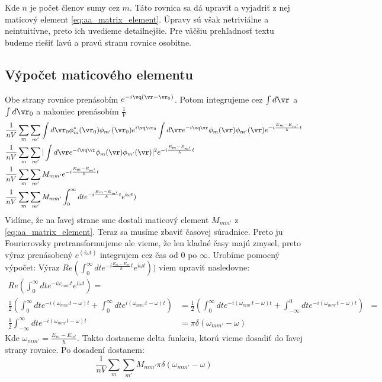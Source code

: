 Kde $n$ je počet členov sumy cez $m$. Táto rovnica sa dá upraviť a vyjadriť z nej maticový element \eqref{eq:aa_matrix_element}.
Úpravy sú však netriviálne a neintuitívne, preto ich uvedieme detailnejšie. Pre väčšiu prehľadnosť textu budeme riešiť ľavú a
pravú stranu rovnice osobitne.
\subsection{Výpočet maticového elementu}
Obe strany rovnice prenásobím $e^{-i\vq(\vr-\vr_0)}$. Potom integrujeme cez $\int d\vr$ a $\int d\vr_0$ a nakoniec prenásobím $\frac{1}{V}$
\begin{align*}
&\frac{1}{nV}\sum_m \sum_{m'} \int d\vr_0  \phi_m^*(\vr_0)\phi_{m'}(\vr_0) e^{i\vq\vr_0} \int d\vr e^{-i\vq\vr}\phi_m(\vr)\phi_{m'}(\vr)e^{-i\frac{E_m-E_{m'}}{\hbar}t} \\
&\frac{1}{nV}\sum_m \sum_{m'}|\int d\vr e^{-i\vq\vr}\phi_m(\vr)\phi_{m'}(\vr)|^2 e^{-i\frac{E_m-E_{m'}}{\hbar}t}\\
&\frac{1}{nV}\sum_m \sum_{m'} M_{mm'} e^{-i\frac{E_m-E_{m'}}{\hbar}t}\\
&\frac{1}{nV}\sum_m \sum_{m'} M_{mm'} \int_0^{\infty} dt e^{-i\frac{E_m-E_{m'}}{\hbar}t} e^{i\omega t})
\end{align*}
Vidíme, že na ľavej strane sme dostali maticový element $M_{mm'}$ z \eqref{eq:aa_matrix_element}. Teraz sa musíme zbaviť časovej súradnice.
Preto ju Fourierovsky pretransformujeme ale vieme, že len kladné časy majú zmysel, preto výraz prenásobený $e^{(i\omega t)}$ integrujem cez čas od $0$ po $\infty$.
Urobíme pomocný výpočet:
 Výraz $Re(\int_0^{\infty} dt e^{-i\frac{E_m-E_{m'}}{\hbar}t} e^{i\omega t}))$ viem upraviť nasledovne:
\begin{align*}
 Re(\int_0^{\infty} dt e^{-i\omega_{mm'}t} e^{i\omega t})=&\\
 \frac{1}{2} (\int_0^{\infty} dt e^{-i(\omega_{mm'}t-\omega)t}+\int_0^{\infty} dt e^{i(\omega_{mm'}t-\omega)t})&=
  \frac{1}{2} (\int_0^{\infty} dt e^{-i(\omega_{mm'}t-\omega)t}+\int_{-\infty}^{0} dt e^{-i(\omega_{mm'}t-\omega)t})&=\\
  \frac{1}{2} \int_{-\infty}^{\infty} dt e^{-i(\omega_{mm'}t-\omega)t}&=\pi \delta(\omega_{mm'}-\omega)
\end{align*}
Kde $\omega_{mm'}=\frac{E_m-E_{m'}}{\hbar}$. Takto dostaneme delta funkciu, ktorú vieme dosadiť do ľavej strany rovnice.
Po dosadení dostanem:
\begin{equation}
 \label{eq:aa_matrix_LHS}
 \frac{1}{nV}\sum_m \sum_{m'} M_{mm'} \pi \delta(\omega_{mm'}-\omega)
\end{equation}
